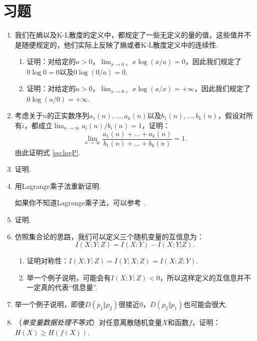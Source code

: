 \section{习题}
\begin{enumerate}[wide, labelindent=0pt]
    \item 我们在熵以及K-L散度的定义中，都规定了一些无定义的量的值，这些值并不是随便规定的，他们实际上反映了熵或者K-L散度定义中的连续性.
    \begin{enumerate}
        \item 证明：对给定的$a>0$，$\lim_{x\to 0+}x\log (x/a)=0$，因此我们规定了$0\log 0=0$以及$0\log(0/a)=0$.
        \item 证明：对给定的$a>0$，$\lim_{x\to 0+}x\log (a/x)=+\infty$，因此我们规定了$0\log(a/0)=+\infty$.
    \end{enumerate}
    
    \item 考虑关于$n$的正实数序列$a_1(n),\dots,a_k(n)$以及$b_1(n),\dots,b_k(n)$，假设对所有$i$，都成立$\lim_{n\to\infty} a_i(n)/b_i(n)=1$，证明：
    \[\lim_{n\to\infty}\frac{a_1(n)+\dots+a_k(n)}{b_1(n)+\dots+b_k(n)}=1.\]
    由此证明式 \eqref{eq:logP}.
    
    \item 证明.
    
    \item 用Lagrange乘子法重新证明.
    \begin{hint}
        如果你不知道Lagrange乘子法，可以参考 .
    \end{hint}

    \item 证明.
    
    \item \cite{tingAmountInformation1962a} 仿照集合论的思路，我们可以定义三个随机变量的互信息为：
    \[I(X;Y;Z)=I(X;Y)-I(X;Y|Z).\]
    \begin{enumerate}
        \item 证明对称性：$I(X;Y;Z)=I(Y;X;Z) = I(X;Z;Y)$.
        \item 举一个例子说明，可能会有$I(X;Y;Z)<0$，所以这样定义的互信息并不一定真的代表“信息量”.
    \end{enumerate}

    \item 举一个例子说明，即便$D(p_1\Vert p_2)$很接近$0$，$D(p_2\Vert p_1)$也可能会很大.
    
    \item （\emph{单变量数据处理不等式}）对任意离散随机变量$X$和函数$f$，证明：$H(X)\geq H(f(X))$.


\end{enumerate}
